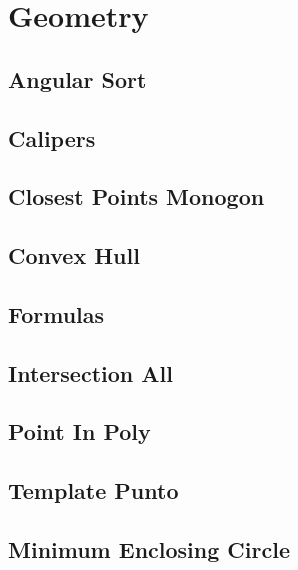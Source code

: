 \documentclass[9pt,portrait,twocolumn,a4paper,notitlepage]{article}
\newcommand\cppfile[2][]{%
\ifstrempty{#1}{}{}%
}
\begin{document}

\section{Geometry}

\subsection{Angular Sort}
\cppfile{geometry_clean/angular_sort.cpp}

\subsection{Calipers}
\cppfile{geometry_clean/calipers.cpp}

\subsection{Closest Points Monogon}
\cppfile{geometry_clean/closest_points_Monogon.cpp}

\subsection{Convex Hull}
\cppfile{geometry_clean/convex_hull.cpp}

\subsection{Formulas}
\cppfile{geometry_clean/formulas.cpp}

\subsection{Intersection All}
\cppfile{geometry_clean/intersection_all.cpp}

\subsection{Point In Poly}
\cppfile{geometry_clean/point_in_poly.cpp}

\subsection{Template Punto}
\cppfile{geometry_clean/template_punto.cpp}

\subsection{Minimum Enclosing Circle}
\cppfile{geometry_clean/minimum_enclosing_circle.cpp}
\end{document}
